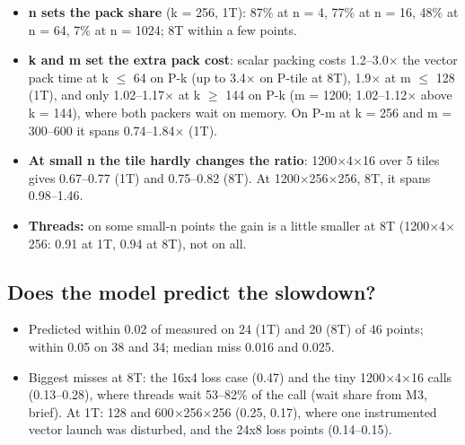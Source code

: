 \begin{itemize}\setlength\itemsep{1pt}
\item \textbf{n sets the pack share} (k = 256, 1T): 87\% at n = 4, 77\% at n = 16, 48\% at n = 64, 7\% at n = 1024; 8T within a few points.
\item \textbf{k and m set the extra pack cost}: scalar packing costs 1.2--3.0$\times$ the vector pack time at k $\le$ 64 on P-k (up to 3.4$\times$ on P-tile at 8T), 1.9$\times$ at m $\le$ 128 (1T), and only 1.02--1.17$\times$ at k $\ge$ 144 on P-k (m = 1200; 1.02--1.12$\times$ above k = 144), where both packers wait on memory. On P-m at k = 256 and m = 300--600 it spans 0.74--1.84$\times$ (1T).
\item \textbf{At small n the tile hardly changes the ratio}: 1200$\times$4$\times$16 over 5 tiles gives 0.67--0.77 (1T) and 0.75--0.82 (8T). At 1200$\times$256$\times$256, 8T, it spans 0.98--1.46.
\item \textbf{Threads:} on some small-n points the gain is a little smaller at 8T (1200$\times$4$\times$256: 0.91 at 1T, 0.94 at 8T), not on all.
\end{itemize}
\ifdefined\svheatmaps\svheatmaps\fi%

\subsection{Does the model predict the slowdown?}
\begin{figure}[htbp]\centering
{}
\end{figure}
\begin{itemize}\setlength\itemsep{1pt}
\item Predicted within 0.02 of measured on 24 (1T) and 20 (8T) of 46 points; within 0.05 on 38 and 34; median miss 0.016 and 0.025.
\item Biggest misses at 8T: the 16x4 loss case (0.47) and the tiny 1200$\times$4$\times$16 calls (0.13--0.28), where threads wait 53--82\% of the call (wait share from M3,  brief). At 1T: 128 and 600$\times$256$\times$256 (0.25, 0.17), where one instrumented vector launch was disturbed, and the 24x8 loss points (0.14--0.15).
\end{itemize}

